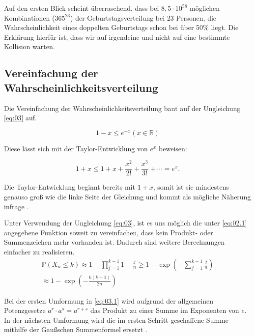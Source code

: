 \documentclass[../main.tex]{subfiles}
\begin{document}
\begin{flushleft}
        Auf den ersten Blick scheint überraschend, dass bei $8,5 \cdot 10^{58}$ möglichen Kombinationen ($365^{23}$) der Geburtstagsverteilung bei 23 Personen, die Wahrscheinlichkeit eines doppelten Geburtstags schon bei über 50\% liegt.
        Die Erklärung hierfür ist, dass wir auf irgendeine und nicht auf eine bestimmte Kollision warten.

        \subsection{Vereinfachung der Wahrscheinlichkeitsverteilung}\label{subsec:vereinfachung-der-wahrscheinlichkeitsverteilung}

        Die Vereinfachung der Wahrscheinlichkeitsverteilung baut auf der Ungleichung \ref{eq:03} auf.

        \begin{equation}
            1 - x \leq e^{ -x } (x \in \mathbb{R}) \label{eq:03}
        \end{equation}

        Diese lässt sich mit der Taylor-Entwicklung von $e^x$ beweisen:

        \begin{equation}
            1 + x \leq 1 + x + \frac{x^2}{2!} + \frac{x^3}{3!} + \cdots = e^x.
        \end{equation}

        Die Taylor-Entwicklung beginnt bereits mit $1+x$, somit ist sie mindestens genauso groß wie die linke Seite der Gleichung und kommt als mögliche Näherung infrage \cite[560ff]{papula}. \newline

        Unter Verwendung der Ungleichung \ref{eq:03}, ist es uns möglich die unter \ref{eq:02.1} angegebene Funktion soweit zu vereinfachen, dass kein Produkt- oder Summenzeichen mehr vorhanden ist.
        Dadurch sind weitere Berechnungen einfacher zu realisieren.
        \begin{eqnarray}
            \mathbb{P}(X_{ n } \leq k) \approx 1 - \prod_{ j = 1 }^{ k - 1 }{ 1 - \frac{ j }{ n } } \geq 1 - \exp( - \sum_{ j = 1 }^{ k - 1 }{ \frac{ j }{ n } } )  \label{eq:03.1}\\
            \approx 1 - \exp( - \frac{ k (k + 1) }{ 2n } )  \label{eq:03.2}
        \end{eqnarray}

        Bei der ersten Umformung in \ref{eq:03.1} wird aufgrund der allgemeinen Potenzgesetze  $a^{ r } \cdot a^{ s } = a^{ r + s }$ \cite[267]{papula} das Produkt zu einer Summe im Exponenten von $e$. In der nächsten Umformung wird die im ersten Schritt geschaffene Summe mithilfe der Gaußschen Summenformel ersetzt \cite[9ff]{petkovsek1996b}. \newline


\end{flushleft}
\end{document}
